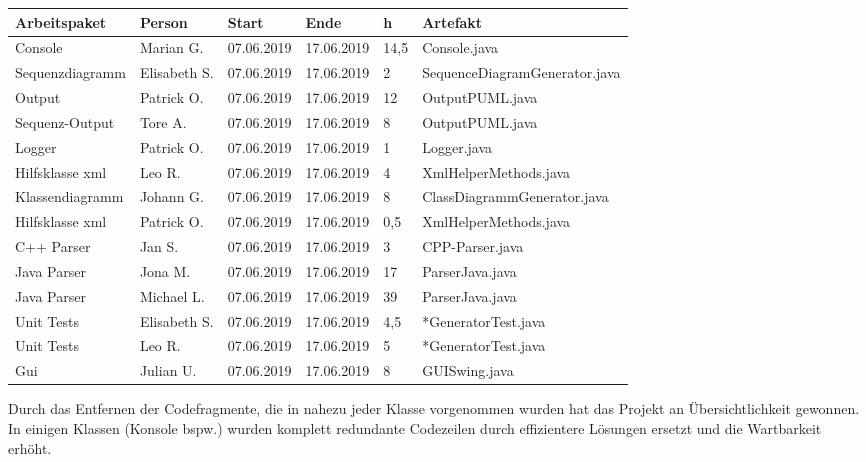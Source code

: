 \begin{longtable}{|p{4cm}|l|l|l|l|l|}
        \hline
        Arbeitspaket & Person & Start & Ende & h & Artefakt\\
        \hline
        Console & Marian G. & 07.06.2019 & 17.06.2019 & 14,5 & Console.java\\ \hline
        Sequenzdiagramm & Elisabeth S.  & 07.06.2019 & 17.06.2019  &2 & SequenceDiagramGenerator.java \\ \hline
        Output & Patrick O.  & 07.06.2019 & 17.06.2019  & 12  & OutputPUML.java \\ \hline
        Sequenz-Output & Tore A.  & 07.06.2019 & 17.06.2019  & 8  & OutputPUML.java \\ \hline
        Logger & Patrick O.  & 07.06.2019 & 17.06.2019  & 1  & Logger.java \\ \hline
        Hilfsklasse xml & Leo R.  & 07.06.2019 & 17.06.2019  & 4  & XmlHelperMethods.java \\ \hline
        Klassendiagramm & Johann G.  & 07.06.2019 & 17.06.2019  & 8 & ClassDiagrammGenerator.java \\ \hline
        Hilfsklasse xml  & Patrick O.  & 07.06.2019 & 17.06.2019  & 0,5 & XmlHelperMethods.java \\ \hline
        C++ Parser  & Jan S.  & 07.06.2019 & 17.06.2019  & 3 & CPP-Parser.java \\ \hline
        Java Parser  & Jona M.  & 07.06.2019 & 17.06.2019  & 17 & ParserJava.java \\ \hline
        Java Parser  & Michael L.  & 07.06.2019 & 17.06.2019  & 39 & ParserJava.java \\ \hline
        Unit Tests  & Elisabeth S.  & 07.06.2019 & 17.06.2019  & 4,5 & *GeneratorTest.java \\ \hline
        Unit Tests  & Leo R.  & 07.06.2019 & 17.06.2019  & 5 & *GeneratorTest.java \\ \hline
        Gui  & Julian U. & 07.06.2019 & 17.06.2019  & 8 & GUISwing.java \\ \hline
\end{longtable}     
\nsecend

Durch das Entfernen der Codefragmente, die in nahezu jeder Klasse vorgenommen wurden hat das Projekt an Übersichtlichkeit gewonnen. In einigen Klassen (Konsole bspw.) wurden komplett redundante Codezeilen durch effizientere Lösungen ersetzt und die Wartbarkeit erhöht.
\nsecend%


